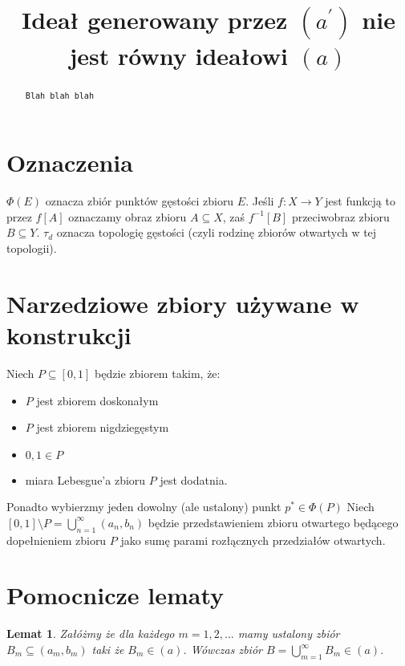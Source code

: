 \documentclass[12pt]{amsart}
\author{\dummy}
\theoremstyle{plain}
\newtheorem{lemma}[theorem]{Lemat}
\theoremstyle{definition}
\theoremstyle{remark}
\newcommand{\dummy}{{\tt Blah blah blah}}
\newcommand{\aideal}{\mathit{(a)}}
\newcommand{\aidealprime}{\mathit{(a^\prime)}}
\begin{document}
\title{Ideał generowany przez $\aidealprime$ nie jest równy ideałowi $\aideal$}

\begin{abstract}
\dummy
\end{abstract}

\maketitle

\section{Oznaczenia}
$\Phi(E)$ oznacza zbiór punktów gęstości zbioru $E$.
Jeśli $f \colon X \to Y$ jest funkcją to przez
$f[A]$ oznaczamy obraz zbioru $A\subseteq X$, 
zaś $f^{-1}[B]$ przeciwobraz zbioru $B \subseteq Y$.
$\tau_d$ oznacza topologię gęstości (czyli rodzinę zbiorów otwartych w tej topologii).


\section{Narzedziowe zbiory używane w konstrukcji}

Niech $P \subseteq [0,1]$ będzie zbiorem takim, że:
\begin{itemize}
\item
  $P$ jest zbiorem doskonałym
\item
  $P$ jest zbiorem nigdziegęstym
\item
  $0, 1 \in P$
\item
  miara Lebesgue'a zbioru $P$ jest dodatnia.
\end{itemize}

Ponadto wybierzmy jeden dowolny (ale ustalony) punkt $p^* \in \Phi(P)$
Niech $[0, 1] \setminus P = \bigcup_{n=1}^\infty (a_n, b_n)$ będzie
przedstawieniem zbioru otwartego będącego dopełnieniem zbioru $P$
jako sumę parami rozłącznych przedziałów otwartych.

\section{Pomocnicze lematy}

\begin{lemma}
\label{lemat-o-sumie}
Załóżmy że dla każdego $m = 1,2,\ldots$ mamy ustalony zbiór
$B_m \subseteq (a_m, b_m)$ taki że $B_m \in \aideal$.
Wówczas zbiór $B = \bigcup_{m=1}^{\infty} B_m \in \aideal$.
\end{lemma}
\end{document}
